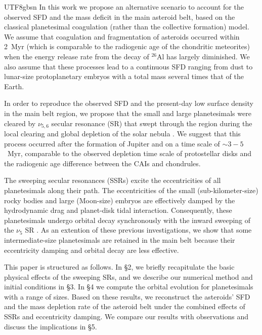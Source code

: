 \documentclass[tighten]{aastex6}
\begin{document}
\begin{CJK*}{UTF8}{gbsn}
In this work we propose an alternative scenario to account for 
the observed SFD and the mass deficit in the main asteroid belt, 
based on the classical planetesimal coagulation (rather than 
the collective formation) model.  We assume that coagulation 
and fragmentation 
of asteroids occurred within 2~Myr (which is comparable 
to the radiogenic age of the chondritic meteorites)
when the energy release rate from the decay of $^{26}$Al has 
largely diminished.  We also assume that these processes lead 
to a continuous SFD ranging from dust to lunar-size protoplanetary 
embryos \citep{chambers2008} with a total mass several times that 
of the Earth.

In order to reproduce the observed SFD and the present-day low surface 
density in the main belt region, we propose that the small 
and large planetesimals were cleared by $\nu_{5,6}$ secular 
resonance (SR) that swept through the region during the local 
clearing and global depletion of the solar nebula
\citep[e.g.][and references therein]{heppenheimer1980, ward1981, lemaitre1991, lecar1997,nagasawaida2000, nagasawa2000, nagasawa2001, nagasawa2002, obrien2007}. We suggest that this process occurred after the formation of Jupiter and on a time scale
 of $\sim 3-5$~Myr, comparable to the observed depletion time 
scale of protostellar disks \citep{hartmann1998} and  
the radiogenic age difference between the CAIs and chondrules.

The sweeping secular resonances (SSRs) excite the eccentricities of 
all planetesimals along their path.  The eccentricities of the 
small (sub-kilometer-size) rocky bodies and large (Moon-size) embryos 
are effectively damped by the hydrodynamic drag and planet-disk 
tidal interaction.  Consequently, these planetesimals undergo 
orbital decay synchronously with the inward sweeping of the 
$\nu_5$ SR \citep{nagasawa2005, thommes2008}.  As an extention
of these previous investigations, we show that some intermediate-size planetesimals are retained in the main belt because their
eccentricity damping and orbital decay are less effective.  
 
This paper is structured as follows.  In \S2, we briefly 
recapitulate the basic physical effects of the sweeping SRs, and we describe our numerical method and initial conditions in \S3. 
In \S4 we compute the orbital evolution for 
planetesimals with a range of sizes. Based on these results, 
we reconstruct the asteroids' SFD and the mass depletion 
rate of the asteroid belt under the combined effects of 
SSRs and eccentricity damping.  We 
compare our results with observations and discuss the 
implications in \S5.



\end{CJK*}
\end{document}
